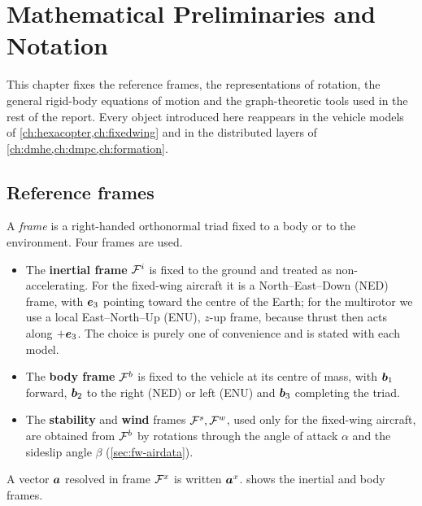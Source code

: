 \chapter{Mathematical Preliminaries and Notation}
\label{ch:preliminaries}

This chapter fixes the reference frames, the representations of rotation, the
general rigid-body equations of motion and the graph-theoretic tools used in the
rest of the report. Every object introduced here reappears in the vehicle models
of \cref{ch:hexacopter,ch:fixedwing} and in the distributed layers of
\cref{ch:dmhe,ch:dmpc,ch:formation}.

\section{Reference frames}
\label{sec:frames}

A \emph{frame} is a right-handed orthonormal triad fixed to a body or to the
environment. Four frames are used.
\begin{itemize}[nosep,leftmargin=1.4em]
  \item The \textbf{inertial frame} $\mathcal{F}^{i}$ is fixed to the ground and
        treated as non-accelerating. For the fixed-wing aircraft it is a
        North--East--Down (NED) frame, with $\bm{e}_3$ pointing toward the centre
        of the Earth; for the multirotor we use a local East--North--Up (ENU),
        $z$-up frame, because thrust then acts along $+\bm{e}_3$. The choice is
        purely one of convenience and is stated with each model.
  \item The \textbf{body frame} $\mathcal{F}^{b}$ is fixed to the vehicle at its
        centre of mass, with $\bm{b}_1$ forward, $\bm{b}_2$ to the right (NED) or
        left (ENU) and $\bm{b}_3$ completing the triad.
  \item The \textbf{stability} and \textbf{wind} frames $\mathcal{F}^{s},\mathcal{F}^{w}$,
        used only for the fixed-wing aircraft, are obtained from $\mathcal{F}^{b}$ by
        rotations through the angle of attack $\alpha$ and the sideslip angle
        $\beta$ (\cref{sec:fw-airdata}).
\end{itemize}
A vector $\bm{a}$ resolved in frame $\mathcal{F}^{x}$ is written $\bm{a}^{x}$.
 shows the inertial and body frames.

